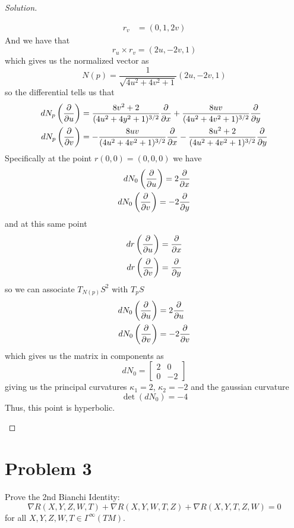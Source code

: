 \documentclass[a4paper]{article}
\begin{document}
\begin{proof}[Solution]
\begin{enumerate}[(a)]
\[\begin{aligned}
          r_v &= (0, 1, 2v)
        \end{aligned}
      \]
      And we have that
      \[
        r_u \times r_v = (2u, -2v, 1)
      \]
      which gives us the normalized vector as
      \[
        N(p) = \frac{1}{\sqrt{4u^2 + 4v^2 + 1}} (2u, -2v, 1)
      \]
      so the differential tells us that
      \[
        \begin{aligned}
          dN_p \left( \pdv{u} \right) &= \frac{8v^2 + 2}{(4u^2 + 4y^2 + 1)^{3/2}} \pdv{x} + \frac{8uv}{(4u^2 + 4v^2 + 1)^{3/2}}\pdv{y} \\
          dN_p \left( \pdv{v}  \right) &= - \frac{8uv}{(4u^2 + 4v^2 + 1)^{3/2}} \pdv{x} - \frac{8u^2 + 2}{(4u^2 + 4v^2 + 1)^{3/2}} \pdv{y}
        \end{aligned}
      \]
      Specifically at the point $r(0,0) = (0,0,0)$ we have
      \[
        \begin{aligned}
          dN_0 \left( \pdv{u} \right) = 2 \pdv{x} \\
          dN_0 \left( \pdv{v} \right) = -2 \pdv{y}
        \end{aligned}
      \]
      and at this same point
      \[
        \begin{aligned}
          dr \left( \pdv{u} \right) &=  \pdv{x} \\
          dr \left( \pdv{v} \right) &= \pdv{y}
        \end{aligned}
      \]
      so we can associate $T_{N(p)}S^2$ with $T_pS$
      \[
        \begin{aligned}
          dN_0 \left(\pdv{u}\right) &= 2 \pdv{u} \\
          dN_0 \left(\pdv{v}  \right) &= -2 \pdv{v}
        \end{aligned}
      \]
      which gives us the matrix in components as
      \[
        dN_0 =
        \begin{bmatrix}
          2 & 0 \\
          0 & -2
        \end{bmatrix}
      \]
      giving us the principal curvatures $\kappa_1 = 2$, $\kappa_2 = -2$ and the gaussian curvature
      \[
        \det(dN_0) = -4
      \]
      Thus, this point is hyperbolic.
  \end{enumerate}
\end{proof}

\section*{Problem 3}%
Prove the 2nd Bianchi Identity:
\[
  \nabla R(X,Y,Z,W,T) + \nabla R(X,Y,W,T,Z) + \nabla R(X,Y,T,Z,W) = 0
\]
for all $X,Y,Z,W,T \in \Gamma^{\infty}(TM)$.
\end{document}

